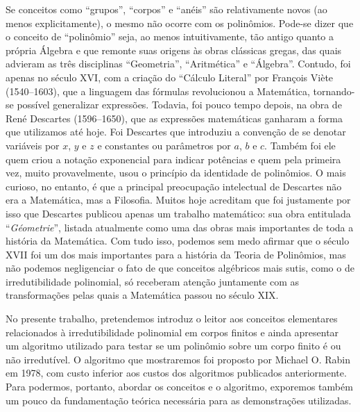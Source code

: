 Se conceitos como ``grupos'', ``corpos'' e ``anéis'' são relativamente
novos (ao menos explicitamente), o mesmo não ocorre com os
polinômios. Pode-se dizer que o
conceito de ``polinômio'' seja, ao menos intuitivamente,
tão antigo quanto a própria Álgebra e que remonte suas origens às obras
clássicas
gregas, das quais advieram
as três disciplinas ``Geometria'', ``Aritmética''
e ``Álgebra''. Contudo, foi apenas no século XVI, com a criação do
``Cálculo Literal'' por François Viète (1540--1603), que a linguagem das
fórmulas revolucionou a Matemática, tornando-se possível
generalizar expressões.
Todavia, foi pouco tempo depois, na obra de René Descartes (1596--1650),
que as expressões matemáticas ganharam a forma que utilizamos até
hoje. Foi Descartes que introduziu a convenção de se denotar variáveis
por $x$, $y$ e $z$ e constantes ou parâmetros por $a$, $b$ e $c$. Também
foi ele quem criou a notação exponencial para indicar potências e quem
pela primeira vez, muito provavelmente, usou o
princípio da identidade de polinômios. O mais
curioso, no entanto, é que a principal preocupação intelectual de
Descartes não era a Matemática, mas a Filosofia. Muitos hoje acreditam
que foi justamente por isso que Descartes publicou apenas um trabalho
matemático: sua obra entitulada ``\textit{Géometrie}'', listada
atualmente como uma das obras mais importantes de toda a história da
Matemática. Com tudo isso, podemos sem medo afirmar que o século XVII
foi um dos mais importantes para a história da Teoria de
Polinômios, mas não podemos negligenciar o fato de que conceitos
algébricos mais sutis, como o de irredutibilidade polinomial, só
receberam atenção juntamente com as transformações pelas quais a
Matemática passou no século XIX.

No presente trabalho, pretendemos introduz o leitor aos conceitos
elementares relacionados à irredutibilidade polinomial em corpos finitos
e ainda
apresentar um algoritmo utilizado para testar se um polinômio sobre um
corpo finito é ou não
irredutível. O algoritmo que mostraremos foi proposto por Michael
O. Rabin em 1978\cite{pralgffrabin}, com custo inferior aos custos dos
algoritmos publicados anteriormente. Para podermos, portanto,
abordar
os conceitos e o algoritmo, exporemos também um pouco da fundamentação
teórica necessária para as demonstrações utilizadas.

